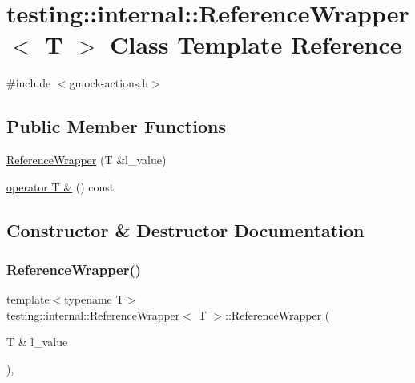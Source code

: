 \hypertarget{classtesting_1_1internal_1_1_reference_wrapper}{}\section{testing\+:\+:internal\+:\+:Reference\+Wrapper$<$ T $>$ Class Template Reference}
\label{classtesting_1_1internal_1_1_reference_wrapper}


{\ttfamily \#include $<$gmock-\/actions.\+h$>$}

\subsection*{Public Member Functions}
\begin{DoxyCompactItemize}
\item 
\hyperlink{classtesting_1_1internal_1_1_reference_wrapper_ad33597ffc478c3af9190d1a288a76d39}{Reference\+Wrapper} (T \&l\+\_\+value)
\item 
\hyperlink{classtesting_1_1internal_1_1_reference_wrapper_a187d6e6ffb4031444fff10dee7dc7de8}{operator T \&} () const
\end{DoxyCompactItemize}


\subsection{Constructor \& Destructor Documentation}
\mbox{\label{classtesting_1_1internal_1_1_reference_wrapper_ad33597ffc478c3af9190d1a288a76d39}} 
\subsubsection{\texorpdfstring{Reference\+Wrapper()}{ReferenceWrapper()}}
{\footnotesize\ttfamily template$<$typename T$>$ \\
\hyperlink{classtesting_1_1internal_1_1_reference_wrapper}{testing\+::internal\+::\+Reference\+Wrapper}$<$ T $>$\+::\hyperlink{classtesting_1_1internal_1_1_reference_wrapper}{Reference\+Wrapper} (\begin{DoxyParamCaption}\item[{T \&}]{l\+\_\+value }\end{DoxyParamCaption})\hspace{0.3cm}{\ttfamily [inline]}, {\ttfamily [explicit]}}



